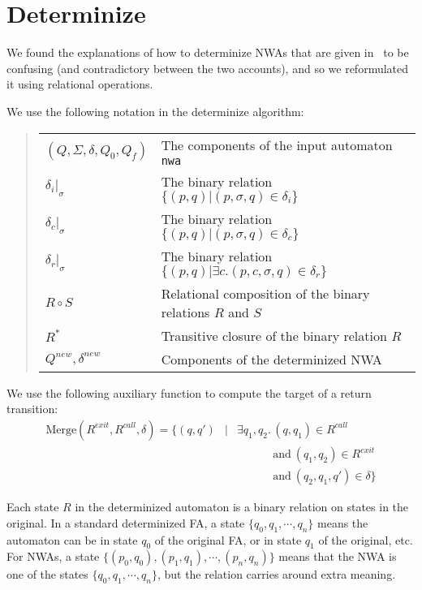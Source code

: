 \section{Determinize}
\label{App:DeterminizeAlgorithm}

We found the explanations of how to determinize NWAs that are given
in~\cite{DLT:AM2006,JACM:AM2009} to be confusing (and contradictory between
the two accounts), and so we reformulated it using relational
operations.

We use the following notation in the determinize algorithm: \\
\begin{quote}
\begin{tabular}{ll}
  $(Q, \Sigma, \delta, Q_0, Q_f)$\hspace{1em}
                                     & The components of the input automaton \texttt{nwa} \\
  $\delta_i|_\sigma$                 & The binary relation $\{(p,q) | (p, \sigma, q) \in\delta_i\}$ \\
  $\delta_c|_\sigma$                 & The binary relation $\{(p,q) | (p, \sigma, q) \in\delta_c\}$ \\
  $\delta_r|_\sigma$                 & The binary relation $\{(p,q) | \exists c. (p, c, \sigma, q) \in\delta_r\}$ \\
  $R \circ S$                        & Relational composition of the binary relations $R$ and $S$ \\
  $R^*$                              & Transitive closure of the binary relation $R$ \\
  $Q^{new}, \delta^{new}$            & Components of the determinized NWA \\
\end{tabular}
\end{quote}
We use the following auxiliary function to compute the target of
a return transition:
\begin{eqnarray*}
  \textrm{Merge}(R^{exit}, R^{call}, \delta) = \{(q, q') & |& \exists q_1, q_2.\,(q, q_1) \in R^{call} \\
                                                         &&  \phantom{\exists q_1, q_2.\,}\textrm{and}\ (q_1, q_2) \in R^{exit} \\
                                                         &&  \phantom{\exists q_1, q_2.\,}\textrm{and}\ (q_2, q_1, q') \in \delta\}
\end{eqnarray*}

Each state $R$ in the determinized automaton is a binary relation on states
in the original. In a standard determinized FA, a state $\{q_0, q_1,
\cdots, q_n\}$ means the automaton can be in state $q_0$ of the original FA, or in
state $q_1$ of the original, etc. For NWAs, a state $\{(p_0, q_0), (p_1,
q_1), \cdots, (p_n, q_n)\}$ means that the NWA is one of the states $\{q_0,
q_1, \cdots, q_n\}$, but the relation carries around extra meaning.

